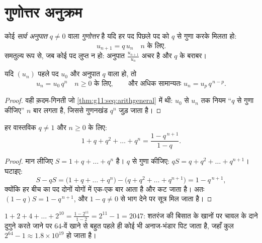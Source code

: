 \section{गुणोत्तर अनुक्रम}

\begin{definition}[गुणोत्तर अनुक्रम]\label{def:g11:seq:geometric}
कोई  \emph{सार्व अनुपात} $q \neq 0$ वाला
\emph{गुणोत्तर}  है यदि हर पद पिछले पद को
$q$ से गुणा करके मिलता हो:
\[
u_{n+1} = q\,u_n \quad n \text{ के लिए}.
\]
समतुल्य रूप से, जब कोई पद लुप्त न हो: अनुपात $\frac{u_{n+1}}{u_n}$ अचर है और $q$ के बराबर।
\end{definition}

\begin{theorem}[व्यापक पद]\label{thm:g11:seq:geomgeneral}
यदि $(u_n)$ पहले पद $u_0$ और अनुपात $q$ वाला  हो, तो
\[
u_n = u_0\, q^n \quad n \geq 0 \text{ के लिए},
\qquad\text{और अधिक सामान्यतः } u_n = u_p\, q^{\,n-p} .
\]
\end{theorem}

\begin{proof}
वही क़दम-गिनती जो \cref{thm:g11:seq:arithgeneral} में थी: $u_0$ से $u_n$ तक नियम ``$q$ से गुणा कीजिए''
$n$ बार लगता है, जिससे गुणनखंड $q^n$ जुड़ जाता है।
\end{proof}

\begin{theorem}[गुणोत्तर योग]\label{thm:g11:seq:geomsum}
हर वास्तविक $q \neq 1$ और  $n \geq 0$ के लिए:
\[
1 + q + q^2 + \dots + q^n = \frac{1 - q^{\,n+1}}{1 - q}.
\]
\end{theorem}

\begin{proof}
मान लीजिए $S = 1 + q + \dots + q^n$ है। $q$ से गुणा कीजिए: $qS = q + q^2 + \dots + q^{n+1}$। घटाइए:
\[
S - qS = \bigl(1 + q + \dots + q^n\bigr)
- \bigl(q + q^2 + \dots + q^{n+1}\bigr) = 1 - q^{\,n+1},
\]
क्योंकि हर बीच का पद दोनों योगों में एक-एक बार आता है और कट जाता है। अतः
$(1 - q)S = 1 - q^{\,n+1}$, और $1 - q \neq 0$ से भाग देने पर सूत्र मिल जाता है।
\end{proof}

\begin{example}\label{ex:g11:seq:chessboard}
$1 + 2 + 4 + \dots + 2^{10} = \frac{1 - 2^{11}}{1 - 2} = 2^{11} - 1 =
2047$: शतरंज की बिसात के खानों पर चावल के दाने दुगुने करते जाने पर $64$-वें
खाने से बहुत पहले ही कोई भी अनाज-भंडार पिट जाता है, जहाँ कुल $2^{64} - 1 \approx 1.8 \times 10^{19}$ हो जाता
है।
\end{example}

